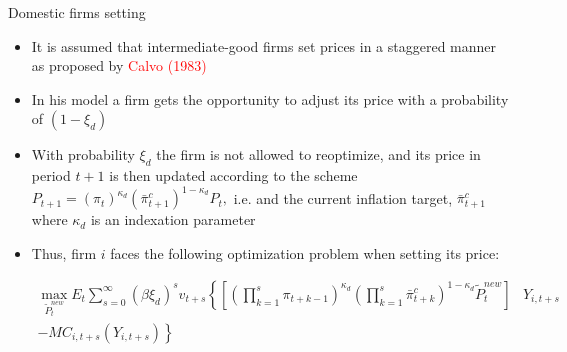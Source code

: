 \documentclass[9pt]{beamer}
\begin{document}
\begin{frame}{Domestic firms setting}
\begin{itemize}
    
    
        \item It is assumed that intermediate-good firms set prices in a staggered manner as proposed by \textcolor{red}{Calvo (1983)}
        
        \item In his model a firm gets the opportunity to adjust its price with a probability of $\left( 1 - \xi_{d} \right)$ 
        
        \item With probability $\xi_{d}$ the firm is not allowed to reoptimize, and its price in period $t+1$ is then updated according to the scheme $P_{t+1}=\left(\pi_{t}\right)^{\kappa_{d}}\left(\bar{\pi}_{t+1}^{c}\right)^{1-\kappa_{d}} P_{t},$ i.e. and the current inflation target, $\bar{\pi}_{t+1}^{c}$ where $\kappa_{d}$ is an indexation parameter 
        
        \item Thus, firm $i$ faces the following optimization problem when setting its price:
        
$$\begin{aligned}
    \max _{\tilde{P}_{t}^{new}} E_{t} \sum_{s=0}^{\infty}\left(\beta \xi_{d}\right)^{s} v_{t+s}\left\{\left[\left(\prod_{k=1}^{s} \pi_{t+k-1}\right)^{\kappa_{d}}\left(\prod_{k=1}^{s} \bar{\pi}_{t+k}^{c}\right)^{1-\kappa_{d}} \tilde{P}_{t}^{new}\right]\right.& Y_{i, t+s} \\
    \left.-M C_{i, t+s}\left(Y_{i, t+s}\right)\right\} &
    \end{aligned}
$$    

    
\label{frame1}
\hyperlink{DomUnit}{}


\end{itemize}


\end{frame}
\end{document}
